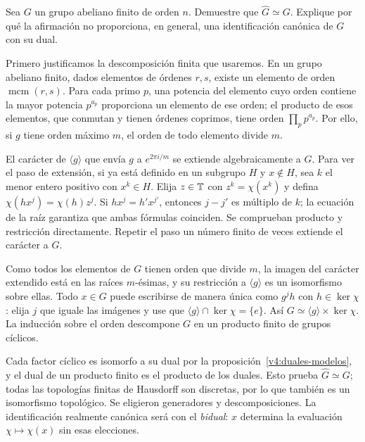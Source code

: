 \begin{ejercicio}\label{ej:v4-l25-1}
Sea $G$ un grupo abeliano finito de orden $n$. Demuestre que $\widehat G\simeq G$. Explique por qué la afirmación no proporciona, en general, una identificación canónica de $G$ con su dual.
\end{ejercicio}
\begin{solucion}
Primero justificamos la descomposición finita que usaremos. En un grupo abeliano finito, dados elementos de órdenes $r,s$, existe un elemento de orden $\operatorname{mcm}(r,s)$. Para cada primo $p$, una potencia del elemento cuyo orden contiene la mayor potencia $p^{a_p}$ proporciona un elemento de ese orden; el producto de esos elementos, que conmutan y tienen órdenes coprimos, tiene orden $\prod_pp^{a_p}$. Por ello, si $g$ tiene orden máximo $m$, el orden de todo elemento divide $m$.

El carácter de $\langle g\rangle$ que envía $g$ a $e^{2\pi i/m}$ se extiende algebraicamente a $G$. Para ver el paso de extensión, si ya está definido en un subgrupo $H$ y $x\notin H$, sea $k$ el menor entero positivo con $x^k\in H$. Elija $z\in\mathbb T$ con $z^k=\chi(x^k)$ y defina $\chi(hx^j)=\chi(h)z^j$. Si $hx^j=h'x^{j'}$, entonces $j-j'$ es múltiplo de $k$; la ecuación de la raíz garantiza que ambas fórmulas coinciden. Se comprueban producto y restricción directamente. Repetir el paso un número finito de veces extiende el carácter a $G$.

Como todos los elementos de $G$ tienen orden que divide $m$, la imagen del carácter extendido está en las raíces $m$-ésimas, y su restricción a $\langle g\rangle$ es un isomorfismo sobre ellas. Todo $x\in G$ puede escribirse de manera única como $g^jh$ con $h\in\ker\chi$: elija $j$ que iguale las imágenes y use que $\langle g\rangle\cap\ker\chi=\{e\}$. Así $G\simeq\langle g\rangle\times\ker\chi$. La inducción sobre el orden descompone $G$ en un producto finito de grupos cíclicos.

Cada factor cíclico es isomorfo a su dual por la proposición~\ref{v4:duales-modelos}, y el dual de un producto finito es el producto de los duales. Esto prueba $\widehat G\simeq G$; todas las topologías finitas de Hausdorff son discretas, por lo que también es un isomorfismo topológico. Se eligieron generadores y descomposiciones. La identificación realmente canónica será con el \emph{bidual}: $x$ determina la evaluación $\chi\mapsto\chi(x)$ sin esas elecciones.
\end{solucion}

